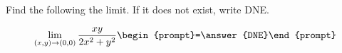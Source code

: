 \documentclass{ximera}
\author{David Guichard \and Neal Koblitz \and H. Jerome Keisler \and Albert Scheller \and Barry Balof \and Mike Wills \and Matthew Carr}
\begin{document}
\begin{exercise}




Find the following the limit. If it does not exist, write DNE. 

\[
\lim_{(x,y)\to(0,0)}\frac{xy}{2x^2+y^2}\begin{prompt}=\answer{DNE}\end{prompt}
\]

\end{exercise}
\end{document}
